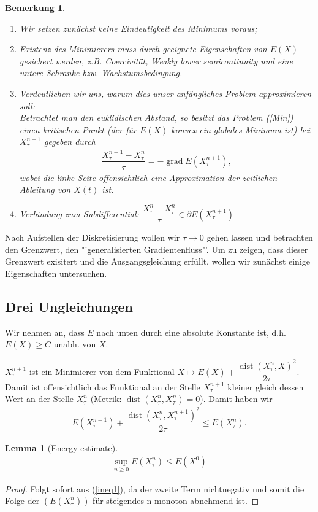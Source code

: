 \documentclass[11pt,a4paper,notitlepage]{scrreprt}
\newcommand{\dist}{\operatorname{dist}}
\newcommand{\grad}{\operatorname{grad}}
\newtheorem{lem}[defi]{Lemma}
\newtheorem{bem}[defi]{Bemerkung}
\begin{document}
\begin{bem}
\begin{enumerate}
\item Wir setzen zunächst keine Eindeutigkeit des Minimums voraus;
\item Existenz des Minimierers muss durch geeignete Eigenschaften von $E(X)$ gesichert werden, z.B. Coercivität, Weakly lower semicontinuity und eine untere Schranke bzw. Wachstumsbedingung. 
\item Verdeutlichen wir uns, warum dies unser anfängliches Problem approximieren soll:\\
Betrachtet man den euklidischen Abstand, so besitzt das Problem (\ref{Min}) einen kritischen Punkt (der für $E(X)$ konvex ein globales Minimum ist) bei $X_\tau^{n+1}$ gegeben durch 
\begin{eqnarray*}
\dfrac{X_\tau^{n+1}-X_\tau^n}{\tau}=-\grad E(X_\tau^{n+1}),
\end{eqnarray*}
wobei die linke Seite offensichtlich eine Approximation der zeitlichen Ableitung von $X(t)$ ist.
\item Verbindung zum Subdifferential: $\dfrac{X_\tau^n-X_\tau^n}{\tau}\in\partial E(X_\tau^{n+1})$
\end{enumerate}
\end{bem}
\vspace{3pt}
Nach Aufstellen der Diskretisierung wollen wir $\tau \to 0$ gehen lassen und betrachten den Grenzwert, den "'generalisierten Gradientenfluss"'.
Um zu zeigen, dass dieser Grenzwert exisitert und die Ausgangsgleichung erfüllt, wollen wir zunächst einige Eigenschaften untersuchen. 

\subsection{Drei Ungleichungen}
Wir nehmen an, dass $E$ nach unten durch eine absolute Konstante ist, d.h. $E(X)\geq C$ unabh. von $X$.
\newline


$X_\tau^{n+1}$ ist ein Minimierer von dem Funktional $X \mapsto E(X)+\dfrac{\dist(X_\tau^n,X)^2}{2\tau}$. Damit ist offensichtlich das Funktional an der Stelle $X_\tau^{n+1}$ kleiner gleich dessen Wert an der Stelle $X_\tau^n$ (Metrik: $\dist(X_\tau^n,X_\tau^n)=0$). Damit haben wir
\begin{eqnarray}
E(X_\tau^{n+1})+\dfrac{\dist(X_\tau^n,X_\tau^{n+1})^2}{2\tau}\leq E(X_\tau^n). \label{ineq1}
\end{eqnarray} 
\begin{lem}[Energy estimate]
\begin{eqnarray}
\sup_{n\geq 0}E(X_\tau^n)\leq E(X^0) \label{enest}
\end{eqnarray}
\end{lem}
\begin{proof}
Folgt sofort aus (\ref{ineq1}), da der zweite Term nichtnegativ und somit die Folge der $(E(X_\tau^n))$ für steigendes n monoton abnehmend ist. 
\end{proof}
\end{document}
